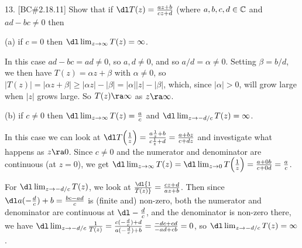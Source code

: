 



\loadmsbm

\dl{\displaystyle}
\ctln{\centerline}
\ssk{\smallskip}
\msk{\medskip}
\bsk{\bigskip}
\ra{\rightarrow}

\overfullrule=0pt
\nopagenumbers



\bsk

\bsk

\item{13.} [BC\#2.18.11] Show that if $\dl T(z)={{az+b}\over{cz+d}}$ 
(where $a,b,c,d\in{\Bbb C}$ and $ad-bc\neq 0$ then 

\msk

\item{(a)} if $c=0$ then $\dl\lim_{z\rightarrow\infty} T(z) = \infty$.

\msk

\item{} In this case $ad-bc=ad\neq 0$, so $a,d\neq 0$, and so $a/d=\alpha\neq 0$. 
Setting $\beta=b/d$, we then have $T(z)=\alpha z+\beta$ with $\alpha\neq 0$, so 
$|T(z)|=|\alpha z+\beta|\geq |\alpha z|-|\beta| = |\alpha||z|-|\beta|$, which, since
$|\alpha|>0$, will grow large when $|z|$ grows large. So $T(z)\ra\infty$ as $z\ra\infty$.

\bsk

\item{(b)} if $c\neq 0$ then $\dl\lim_{z\rightarrow\infty} T(z) = {{a}\over{c}}$ and
$\dl\lim_{z\rightarrow -d/c} T(z) = \infty$.

\msk

\item{} In this case we can look at $\dl T\Big({{1}\over{z}}\Big)={{a{{1}\over{z}}+b}\over{c{{1}\over{z}}+d}}
={{a+bz}\over{c+dz}}$ and investigate what happens as $z\ra 0$. Since $c\neq 0$ and the numerator and
denominator are continuous (at $z=0$), we get
$\dl\lim_{z\rightarrow\infty} T(z) = \dl\lim_{z\rightarrow 0} T\Big({{1}\over{z}}\Big) 
= {{a+0b}\over{c+0d}} =  {{a}\over{c}}$.

\ssk

\item{} For $\dl\lim_{z\rightarrow -d/c} T(z)$, we look at $\dl {{1}\over {T(z)}}={{cz+d}\over{az+b}}$.
Then since $\dl a(-{{d}\over{c}})+b={{bc-ad}\over{c}}$ is (finite and) non-zero, both the
numerator and denominator are continuous at $\dl -{{d}\over{c}}$, and the denominator is non-zero 
there, we have 
$\dl\lim_{z\rightarrow -d/c} {{1}\over{T(z)}} = 
{{c(-{{d}\over{c}})+d}\over{a(-{{d}\over{c}})+b}} ={{-dc+cd}\over{-ad+cb}}=0$,
so $\dl\lim_{z\rightarrow -d/c} T(z) = \infty$.

